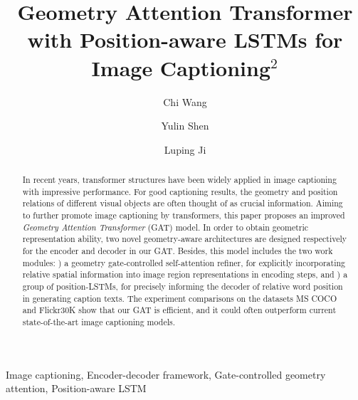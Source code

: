 \documentclass[review]{elsarticle}
\begin{document}
\begin{frontmatter}

  \title{Geometry Attention Transformer with Position-aware LSTMs for Image Captioning$^2$}



  \author{Chi Wang}
  \author{Yulin Shen}

  \author{Luping Ji}

  \address{School of Computer Science and Engineering, University of Electronic Science and Technology of China, \\ Chengdu 611731, P.R. China}


  \begin{abstract}
In recent years, transformer structures have been widely applied in image captioning with impressive performance. For good captioning results, the geometry and position relations of different visual objects are often thought of as crucial information. Aiming to further promote image captioning by transformers, this paper proposes an improved \textit{Geometry Attention Transformer} (GAT) model. In order to obtain geometric representation ability, two novel geometry-aware architectures are designed respectively for the encoder and decoder in our GAT. Besides, this model includes the two work modules: ) a geometry gate-controlled self-attention refiner, for explicitly incorporating relative spatial information into image region representations in encoding steps, and ) a group of position-LSTMs, for precisely informing the decoder of relative word position in generating caption texts. The experiment comparisons on the datasets MS COCO and Flickr30K show that our GAT is efficient, and it could often outperform current state-of-the-art image captioning models.

  \end{abstract}

  \begin{keyword}
    Image captioning, Encoder-decoder framework, Gate-controlled geometry attention, Position-aware LSTM
  \end{keyword}


\end{frontmatter}
\end{document}
